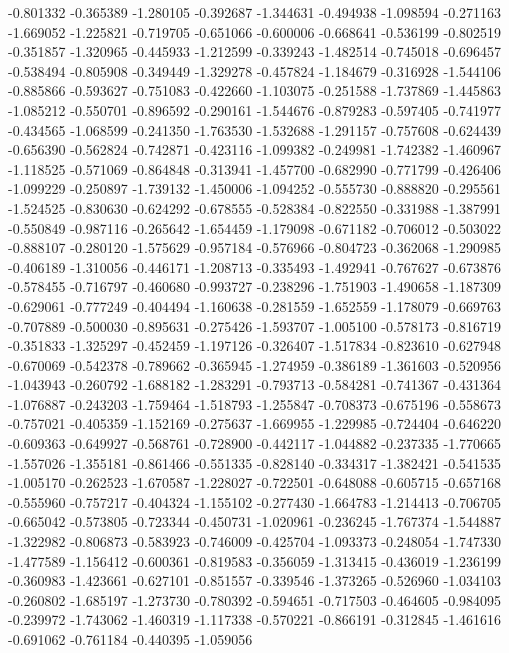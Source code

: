 -0.801332
-0.365389
-1.280105
-0.392687
-1.344631
-0.494938
-1.098594
-0.271163
-1.669052
-1.225821
-0.719705
-0.651066
-0.600006
-0.668641
-0.536199
-0.802519
-0.351857
-1.320965
-0.445933
-1.212599
-0.339243
-1.482514
-0.745018
-0.696457
-0.538494
-0.805908
-0.349449
-1.329278
-0.457824
-1.184679
-0.316928
-1.544106
-0.885866
-0.593627
-0.751083
-0.422660
-1.103075
-0.251588
-1.737869
-1.445863
-1.085212
-0.550701
-0.896592
-0.290161
-1.544676
-0.879283
-0.597405
-0.741977
-0.434565
-1.068599
-0.241350
-1.763530
-1.532688
-1.291157
-0.757608
-0.624439
-0.656390
-0.562824
-0.742871
-0.423116
-1.099382
-0.249981
-1.742382
-1.460967
-1.118525
-0.571069
-0.864848
-0.313941
-1.457700
-0.682990
-0.771799
-0.426406
-1.099229
-0.250897
-1.739132
-1.450006
-1.094252
-0.555730
-0.888820
-0.295561
-1.524525
-0.830630
-0.624292
-0.678555
-0.528384
-0.822550
-0.331988
-1.387991
-0.550849
-0.987116
-0.265642
-1.654459
-1.179098
-0.671182
-0.706012
-0.503022
-0.888107
-0.280120
-1.575629
-0.957184
-0.576966
-0.804723
-0.362068
-1.290985
-0.406189
-1.310056
-0.446171
-1.208713
-0.335493
-1.492941
-0.767627
-0.673876
-0.578455
-0.716797
-0.460680
-0.993727
-0.238296
-1.751903
-1.490658
-1.187309
-0.629061
-0.777249
-0.404494
-1.160638
-0.281559
-1.652559
-1.178079
-0.669763
-0.707889
-0.500030
-0.895631
-0.275426
-1.593707
-1.005100
-0.578173
-0.816719
-0.351833
-1.325297
-0.452459
-1.197126
-0.326407
-1.517834
-0.823610
-0.627948
-0.670069
-0.542378
-0.789662
-0.365945
-1.274959
-0.386189
-1.361603
-0.520956
-1.043943
-0.260792
-1.688182
-1.283291
-0.793713
-0.584281
-0.741367
-0.431364
-1.076887
-0.243203
-1.759464
-1.518793
-1.255847
-0.708373
-0.675196
-0.558673
-0.757021
-0.405359
-1.152169
-0.275637
-1.669955
-1.229985
-0.724404
-0.646220
-0.609363
-0.649927
-0.568761
-0.728900
-0.442117
-1.044882
-0.237335
-1.770665
-1.557026
-1.355181
-0.861466
-0.551335
-0.828140
-0.334317
-1.382421
-0.541535
-1.005170
-0.262523
-1.670587
-1.228027
-0.722501
-0.648088
-0.605715
-0.657168
-0.555960
-0.757217
-0.404324
-1.155102
-0.277430
-1.664783
-1.214413
-0.706705
-0.665042
-0.573805
-0.723344
-0.450731
-1.020961
-0.236245
-1.767374
-1.544887
-1.322982
-0.806873
-0.583923
-0.746009
-0.425704
-1.093373
-0.248054
-1.747330
-1.477589
-1.156412
-0.600361
-0.819583
-0.356059
-1.313415
-0.436019
-1.236199
-0.360983
-1.423661
-0.627101
-0.851557
-0.339546
-1.373265
-0.526960
-1.034103
-0.260802
-1.685197
-1.273730
-0.780392
-0.594651
-0.717503
-0.464605
-0.984095
-0.239972
-1.743062
-1.460319
-1.117338
-0.570221
-0.866191
-0.312845
-1.461616
-0.691062
-0.761184
-0.440395
-1.059056
